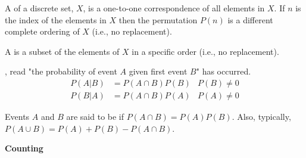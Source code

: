 \documentclass[10pt,a4paper]{report}
\begin{document}
\begin{description}
\begin{description}
		\item A  of a discrete set, $X$, is a one-to-one correspondence of all elements in $X$.  If $n$ is the index of the elements in $X$ then the permutation $P(n)$ is a different complete ordering of $X$ (i.e., no replacement).
		\item A  is a subset of the elements of $X$ in a specific order (i.e., no replacement).
		\item {}, read "the probability of event $A$ given first event $B$" has occurred.
		\begin{align*}
			P(A|B) &= P(A \cap B)P(B) & P(B) \ne 0\\
			P(B|A) &= P(A \cap B)P(A) & P(A) \ne 0
		\end{align*}
		
		\item Events $A$ and $B$ are said to be  if $P(A\cap B) = P(A)P(B)$.  Also, typically, $P(A \cup B) = P(A)+P(B)-P(A\cap B)$.
	\end{description}	
	
\item \textbf{Counting}


\end{description}
\end{document}

